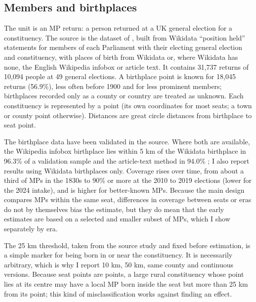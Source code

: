 \documentclass[11pt,a4paper]{article}
\begin{document}
\subsection{Members and birthplaces}
The unit is an MP return: a person returned at a UK general election for a constituency. The source is the dataset of \citet{hotham2026mpl}, built from Wikidata \citep{wikidata} ``position held'' statements for members of each Parliament with their electing general election and constituency, with places of birth from Wikidata or, where Wikidata has none, the English Wikipedia infobox or article text. It contains 31{,}737 returns of 10{,}094 people at 49 general elections. A birthplace point is known for 18{,}045 returns (56.9\%), less often before 1900 and for less prominent members; birthplaces recorded only as a county or country are treated as unknown. Each constituency is represented by a point (its own coordinates for most seats; a town or county point otherwise). Distances are great circle distances from birthplace to seat point.

The birthplace data have been validated in the source. Where both are available, the Wikipedia infobox birthplace lies within 5 km of the Wikidata birthplace in 96.3\% of a validation sample and the article-text method in 94.0\% \citep{hotham2026mpl}; I also report results using Wikidata birthplaces only. Coverage rises over time, from about a third of MPs in the 1830s to 90\% or more at the 2010 to 2019 elections (lower for the 2024 intake), and is higher for better-known MPs. Because the main design compares MPs within the same seat, differences in coverage between seats or eras do not by themselves bias the estimate, but they do mean that the early estimates are based on a selected and smaller subset of MPs, which I show separately by era.

The 25 km threshold, taken from the source study and fixed before estimation, is a simple marker for being born in or near the constituency. It is necessarily arbitrary, which is why I report 10 km, 50 km, same county and continuous versions. Because seat points are points, a large rural constituency whose point lies at its centre may have a local MP born inside the seat but more than 25 km from its point; this kind of misclassification works against finding an effect.
\end{document}
